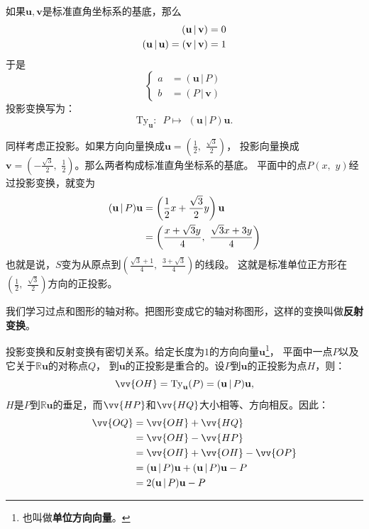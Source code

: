 \documentclass[12pt,UTF8]{ctexbook}
\begin{document}
如果$\mathbf{u}, \mathbf{v}$是标准直角坐标系的基底，那么
\begin{align}
    (\mathbf{u}\,|\,\mathbf{v}) &= 0 \notag \\
    (\mathbf{u}\,|\,\mathbf{u}) = (\mathbf{v}\,|\,\mathbf{v}) &= 1 \notag
\end{align}
于是
$$ 
  \left\{ \begin{array}{lc}
    a &= (\mathbf{u}\,|\,P) \\
    b &= (P\,|\,\mathbf{v})
  \end{array}\right.
$$
投影变换写为：
$$ \mathrm{Ty}_\mathbf{u} :\,\,\, P \mapsto \,\, (\mathbf{u}\,|\,P)\mathbf{u}. $$

同样考虑正投影。如果方向向量换成$\mathbf{u} = \left(\frac{1}{2},\,\,\frac{\sqrt{3}}{2}\right)$，
投影向量换成$\mathbf{v} = \left(-\frac{\sqrt{3}}{2},\,\,\frac{1}{2}\right)$。那么两者构成标准直角坐标系的基底。
平面中的点$P(x,\,\,y)$经过投影变换，就变为
\begin{align}
    (\mathbf{u}\,|\,P)\mathbf{u} &= \left(\frac{1}{2}x + \frac{\sqrt{3}}{2}y\right)\mathbf{u} \notag \\
    &= \left(\frac{x + \sqrt{3}y}{4},\,\, \frac{\sqrt{3}x + 3y}{4}\right) \notag
\end{align}
也就是说，$S$变为从原点到$\left(\frac{\sqrt{3} + 1}{4},\,\,\frac{3 + \sqrt{3}}{4}\right)$的线段。
这就是标准单位正方形在$\left(\frac{1}{2},\,\,\frac{\sqrt{3}}{2}\right)$方向的正投影。

我们学习过点和图形的轴对称。把图形变成它的轴对称图形，这样的变换叫做\textbf{反射变换}。

投影变换和反射变换有密切关系。给定长度为$1$的方向向量$\mathbf{u}$\footnote{也叫做\textbf{单位方向向量}。}，
平面中一点$P$以及它关于$\mathbb{R}\mathbf{u}$的对称点$Q$，
到$\mathbf{u}$的正投影是重合的。设$P$到$\mathbf{u}$的正投影为点$H$，则：
$$ \vv{OH} = \mathrm{Ty}_\mathbf{u}(P) = (\mathbf{u}\,|\,P)\mathbf{u},  $$
$H$是$P$到$\mathbb{R}\mathbf{u}$的垂足，而$\vv{HP}$和$\vv{HQ}$大小相等、方向相反。因此：
\begin{align}
    \qquad \vv{OQ} &= \vv{OH} + \vv{HQ} \notag \\
            &= \vv{OH} - \vv{HP} \notag \\
            &= \vv{OH} + \vv{OH} - \vv{OP} \notag \\
            &= (\mathbf{u}\,|\,P)\mathbf{u} + (\mathbf{u}\,|\,P)\mathbf{u} - P \notag \\
            &= 2(\mathbf{u}\,|\,P)\mathbf{u} - P \notag
\end{align}
\end{document}
